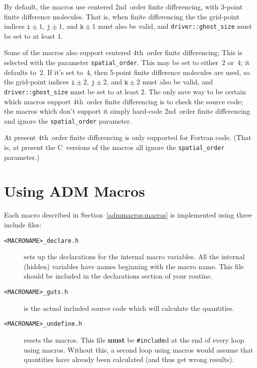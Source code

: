 By default, the macros use centered 2nd~order finite differencing,
with 3-point finite difference molecules.
That is, when finite differencing the the grid-point indices
$\texttt{i} \pm 1$, $\texttt{j} \pm 1$, and $\texttt{k} \pm 1$
must also be valid, and \texttt{driver::ghost\_size} must be set
to at least $1$.

Some of the macros also support centered 4th~order finite differencing;
This is selected with the parameter \verb|spatial_order|.  This may be
set to either~$2$ or~$4$; it defaults to~$2$.  If it's set to~$4$, then
5-point finite difference molecules are used, so the grid-point indices
$\texttt{i} \pm 2$, $\texttt{j} \pm 2$, and $\texttt{k} \pm 2$
must also be valid, and \texttt{driver::ghost\_size} must be set
to at least $2$.  The only save way to be certain which macros support
4th~order finite differencing is to check the source code; the macros
which don't support it simply hard-code 2nd~order finite differencing
and ignore the \texttt{spatial\_order} parameter.

At present 4th~order finite differencing is only supported for Fortran
code.  (That is, at present the C~versions of the macros all ignore the
\texttt{spatial\_order} parameter.)


\section{Using ADM Macros}

Each macro described in Section~\ref{admmacros:macros} is implemented
using three include files:
\begin{description}
\item[\texttt{<MACRONAME>\_declare.h}]
        sets up the declarations for the internal macro variables.
        All the internal (hidden) variables have names beginning
        with the macro name. This file should be included in the
        declarations section of your routine.

\item[\texttt{<MACRONAME>\_guts.h}]
	is the actual included source code which will calculate the quantities.

\item[\texttt{<MACRONAME>\_undefine.h}]
	resets the macros. This file \textbf{must} be \texttt{\#include}d
	at the end of every loop using macros.  Without this, a second loop
        using macros would assume that quantities have already been calculated
	(and thus get wrong results).
\end{description}

